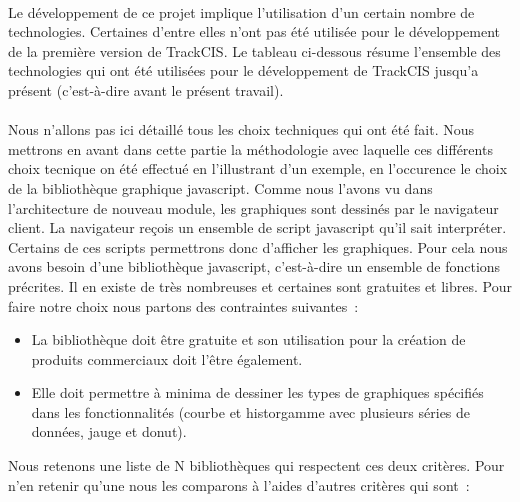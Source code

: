 			\paragraph{}%
			Le développement de ce projet implique l'utilisation d'un certain nombre de
			technologies. Certaines d'entre elles n'ont pas été utilisée pour le
			développement de la première version de TrackCIS.
			Le tableau ci-dessous résume l'ensemble des technologies qui ont été
			utilisées pour le développement de TrackCIS jusqu'a présent (c'est-à-dire
			avant le présent travail).
			
			\paragraph{}%
			Nous n'allons pas ici détaillé tous les choix techniques qui ont été fait.
			Nous mettrons en avant dans cette partie la méthodologie avec laquelle ces
			différents choix tecnique on été effectué en l'illustrant d'un exemple, en
			l'occurence le choix de la bibliothèque graphique javascript. Comme nous
			l'avons vu dans l'architecture de nouveau module, les graphiques sont
			dessinés par le navigateur client. La navigateur reçois un ensemble de script
			javascript qu'il sait interpréter. Certains de ces scripts permettrons donc
			d'afficher les graphiques. Pour cela nous avons besoin d'une bibliothèque
			javascript, c'est-à-dire un ensemble de fonctions précrites. Il en existe de
			très nombreuses et certaines sont gratuites et libres. Pour faire notre choix
			nous partons des contraintes suivantes~:
			\begin{itemize}
			  \item La bibliothèque doit être gratuite et son utilisation pour la
			  création de produits commerciaux doit l'être également.
			  \item Elle doit permettre à minima de dessiner les types de graphiques
			  spécifiés dans les fonctionnalités (courbe et historgamme avec plusieurs
			  séries de données, jauge et donut).
			\end{itemize}
			Nous retenons une liste de N bibliothèques qui respectent ces deux critères.
			Pour n'en retenir qu'une nous les comparons à l'aides d'autres critères qui
			sont~:
